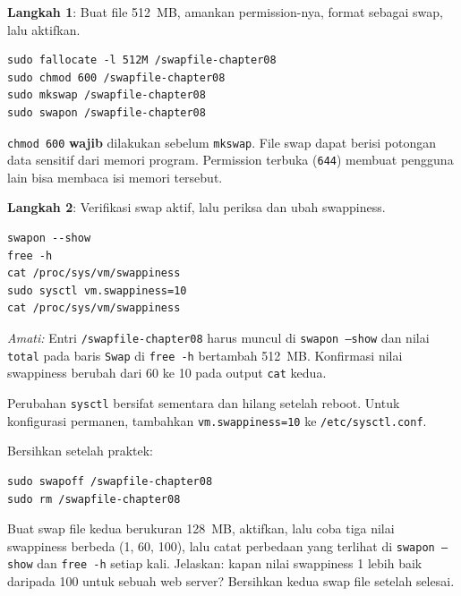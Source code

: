 \textbf{Langkah 1}: Buat file 512~MB, amankan permission-nya, format sebagai swap,
lalu aktifkan.

\begin{lstlisting}[caption={Membuat dan mengaktifkan swap}]
sudo fallocate -l 512M /swapfile-chapter08
sudo chmod 600 /swapfile-chapter08
sudo mkswap /swapfile-chapter08
sudo swapon /swapfile-chapter08
\end{lstlisting}

\begin{warningbox}
\texttt{chmod 600} \textbf{wajib} dilakukan sebelum \texttt{mkswap}. File swap dapat
berisi potongan data sensitif dari memori program. Permission terbuka (\texttt{644})
membuat pengguna lain bisa membaca isi memori tersebut.
\end{warningbox}

\textbf{Langkah 2}: Verifikasi swap aktif, lalu periksa dan ubah swappiness.

\begin{lstlisting}[caption={Verifikasi dan atur swappiness}]
swapon --show
free -h
cat /proc/sys/vm/swappiness
sudo sysctl vm.swappiness=10
cat /proc/sys/vm/swappiness
\end{lstlisting}

\textit{Amati:} Entri \texttt{/swapfile-chapter08} harus muncul di \texttt{swapon --show}
dan nilai \texttt{total} pada baris \texttt{Swap} di \texttt{free -h} bertambah 512~MB.
Konfirmasi nilai swappiness berubah dari 60 ke 10 pada output \texttt{cat} kedua.

\begin{notebox}
Perubahan \texttt{sysctl} bersifat sementara dan hilang setelah reboot. Untuk
konfigurasi permanen, tambahkan \texttt{vm.swappiness=10} ke \texttt{/etc/sysctl.conf}.

Bersihkan setelah praktek:
\begin{lstlisting}
sudo swapoff /swapfile-chapter08
sudo rm /swapfile-chapter08
\end{lstlisting}
\end{notebox}

\begin{challengebox}
Buat swap file kedua berukuran 128~MB, aktifkan, lalu coba tiga nilai swappiness
berbeda (1, 60, 100), lalu catat perbedaan yang terlihat di \texttt{swapon --show}
dan \texttt{free -h} setiap kali. Jelaskan: kapan nilai swappiness 1 lebih baik
daripada 100 untuk sebuah web server? Bersihkan kedua swap file setelah selesai.
\end{challengebox}

